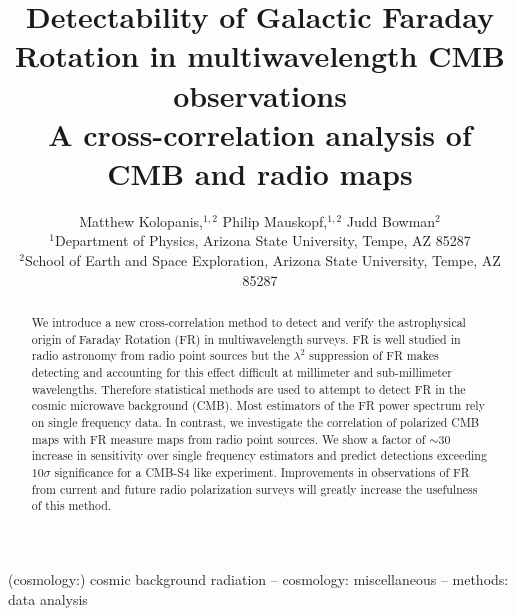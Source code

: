 \documentclass[usenatbib,hidelinks]{mnras}
\title[Detectability of Galactic Faraday Rotation]{Detectability of Galactic Faraday Rotation in multiwavelength CMB observations \\ 
 {\footnotesize A cross-correlation analysis of CMB and radio maps}}
\author[Kolopanis, Mauskopf, \& Bowman]{
Matthew Kolopanis,${}^{1,2}$
Philip Mauskopf,${}^{1,2}$
Judd Bowman${}^{2}$\\
${}^{1}$Department of Physics, Arizona State University, Tempe, AZ 85287\\
${}^{2}$School of Earth and Space Exploration, Arizona State University, Tempe, AZ 85287 
}
\begin{document}
\maketitle
\begin{abstract} 
We introduce a new cross-correlation method to detect and verify the astrophysical origin of Faraday Rotation (FR) in multiwavelength surveys.
FR is well studied in radio astronomy from radio point sources 
but the $\lambda^{2}$ suppression of FR
makes detecting and accounting for this effect difficult at millimeter and sub-millimeter wavelengths. 
Therefore statistical methods are used to attempt to detect FR in the cosmic microwave background (CMB). Most estimators of the FR power spectrum rely on single frequency data. 
In contrast, we investigate the correlation of polarized CMB maps with FR measure maps from radio point sources.
We show a factor of $\sim30$ increase in sensitivity over single frequency estimators and predict detections exceeding $10\sigma$ significance for a CMB-S4 like experiment.
Improvements in observations of FR from current and future radio polarization surveys will greatly increase the usefulness of this method.
 
\end{abstract}
\begin{keywords}
(cosmology:) cosmic background radiation  -- cosmology: miscellaneous -- methods: data analysis
\end{keywords}
\end{document}
